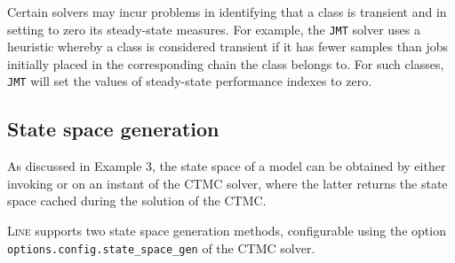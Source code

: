 Certain solvers may incur problems in identifying that a class is transient and in setting to zero its steady-state measures. For example, the \texttt{JMT} solver uses a heuristic whereby a class is considered transient if it has fewer samples than jobs initially placed in the corresponding chain the class belongs to. For such classes, \texttt{JMT} will set the values of steady-state performance indexes to zero.

\subsection{State space generation}
As discussed in Example 3, the state space of a model can be obtained by either invoking  or  on an instant of the CTMC solver, where the latter returns the state space cached during the solution of the CTMC.

\textsc{Line} supports two state space generation methods, configurable using the option \texttt{options.config.state\_\-space\_gen} of the CTMC solver. 

